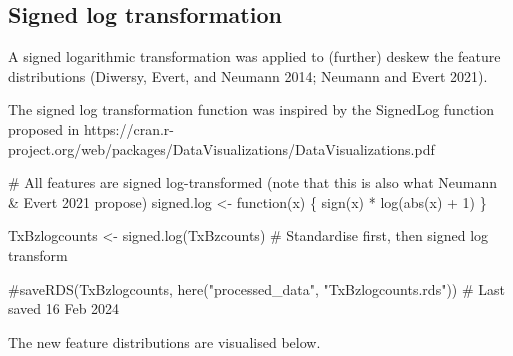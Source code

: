 \documentclass[
  letterpaper,
  DIV=11,
  numbers=noendperiod]{scrreprt}
\newenvironment{Shaded}{\begin{snugshade}}{\end{snugshade}}
\newcommand{\CommentTok}[1]{\textcolor[rgb]{0.37,0.37,0.37}{#1}}
\newcommand{\ControlFlowTok}[1]{\textcolor[rgb]{0.00,0.23,0.31}{#1}}
\newcommand{\DecValTok}[1]{\textcolor[rgb]{0.68,0.00,0.00}{#1}}
\newcommand{\FunctionTok}[1]{\textcolor[rgb]{0.28,0.35,0.67}{#1}}
\newcommand{\NormalTok}[1]{\textcolor[rgb]{0.00,0.23,0.31}{#1}}
\newcommand{\OtherTok}[1]{\textcolor[rgb]{0.00,0.23,0.31}{#1}}
\newcommand{\SpecialCharTok}[1]{\textcolor[rgb]{0.37,0.37,0.37}{#1}}
\begin{document}
\subsection{Signed log transformation}\label{signed-log-transformation}

A signed logarithmic transformation was applied to (further) deskew the
feature distributions (Diwersy, Evert, and Neumann 2014; Neumann and
Evert 2021).

The signed log transformation function was inspired by the SignedLog
function proposed in
https://cran.r-project.org/web/packages/DataVisualizations/DataVisualizations.pdf

\begin{Shaded}
\begin{Highlighting}[]
\CommentTok{\# All features are signed log{-}transformed (note that this is also what Neumann \& Evert 2021 propose)}
\NormalTok{signed.log }\OtherTok{\textless{}{-}} \ControlFlowTok{function}\NormalTok{(x) \{}
  \FunctionTok{sign}\NormalTok{(x) }\SpecialCharTok{*} \FunctionTok{log}\NormalTok{(}\FunctionTok{abs}\NormalTok{(x) }\SpecialCharTok{+} \DecValTok{1}\NormalTok{)}
\NormalTok{  \}}

\NormalTok{TxBzlogcounts }\OtherTok{\textless{}{-}} \FunctionTok{signed.log}\NormalTok{(TxBzcounts) }\CommentTok{\# Standardise first, then signed log transform}

\CommentTok{\#saveRDS(TxBzlogcounts, here("processed\_data", "TxBzlogcounts.rds")) \# Last saved 16 Feb 2024}
\end{Highlighting}
\end{Shaded}

The new feature distributions are visualised below.
\end{document}

